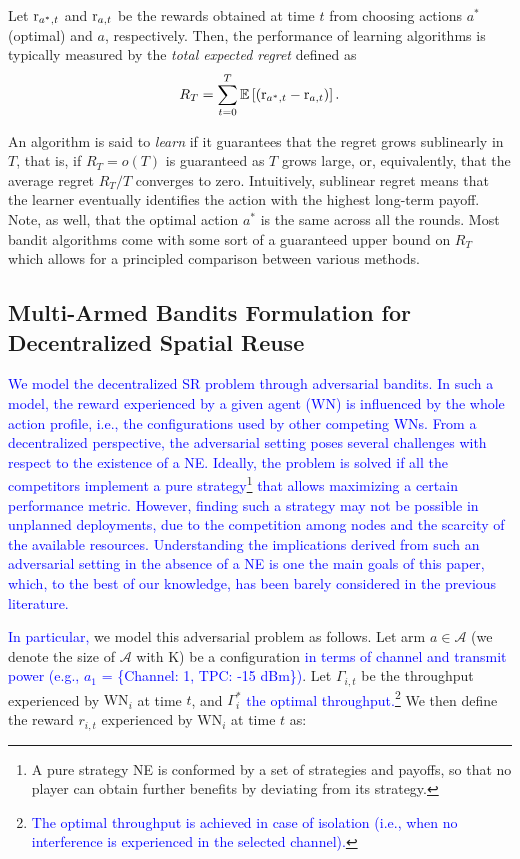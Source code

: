 \documentclass[preprint,12pt]{elsarticle}
\begin{document}
	Let ${\rm r}_{a^*,t}$ and ${\rm r}_{a,t}$ be the rewards obtained at time $t$ from choosing actions $a^*$ (optimal) and $a$, respectively. Then, the performance of learning algorithms is typically measured by the \emph{total expected regret} defined as  \[R_T = \sum_{t=0}^{T} \mathbb{E}\left[\left({\rm r}_{a^*,t} - {\rm r}_{a,t}\right)\right].\]
	
	An algorithm is said to \emph{learn} if it guarantees that the regret grows sublinearly in $T$, that is, if $R_T = o(T)$ is guaranteed as $T$ grows large, or, equivalently, that the average regret $R_T/T$ converges to zero. Intuitively, sublinear regret means that the learner eventually identifies the action with the highest long-term payoff. Note, as well, that the optimal action $a^*$ is the same across all the rounds. Most bandit algorithms come with some sort of a guaranteed upper bound on $R_T$ which allows for a principled comparison between various methods. 
	
	\subsection{Multi-Armed Bandits Formulation for Decentralized Spatial Reuse}
	
	\textcolor{blue}{We model the decentralized SR problem through adversarial bandits. In such a model, the reward experienced by a given agent (WN) is influenced by the whole action profile, i.e., the configurations used by other competing WNs. From a decentralized perspective, the adversarial setting poses several challenges with respect to the existence of a NE. Ideally, the problem is solved if all the competitors implement a pure strategy\footnote{A pure strategy NE is conformed by a set of strategies and payoffs, so that no player can obtain further benefits by deviating from its strategy.} that allows maximizing a certain performance metric. However, finding such a strategy may not be possible in unplanned deployments, due to the competition among nodes and the scarcity of the available resources. Understanding the implications derived from such an adversarial setting in the absence of a NE is one the main goals of this paper, which, to the best of our knowledge, has been barely considered in the previous literature.}
	
	\textcolor{blue}{In particular,} we model this adversarial problem as follows. Let arm $a \in \mathcal{A}$ (we denote the size of $\mathcal{A}$ with K) be a configuration \textcolor{blue}{in terms of channel and transmit power (e.g., $a_1$ = \{Channel: 1, TPC: -15 dBm\})}. Let $\Gamma_{i,t}$ be the throughput experienced by $\text{WN}_i$ at time $t$, and $\Gamma_{i}^*$ \textcolor{blue}{the optimal throughput.}\footnote{\textcolor{blue}{The optimal throughput is achieved in case of isolation (i.e., when no interference is experienced in the selected channel).}} We then define the reward $r_{i,t}$ experienced by $\text{WN}_i$ at time $t$ as:
	
\end{document}
